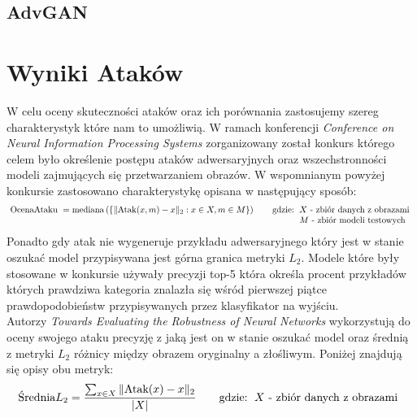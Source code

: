 \documentclass{article}
\begin{document}
\subsection{AdvGAN}

\section{Wyniki Ataków}
    W celu oceny skuteczności ataków oraz ich porównania zastosujemy szereg charakterystyk które nam to umożliwią.
    W ramach konferencji
    \textit{Conference on Neural Information Processing Systems} zorganizowany został konkurs którego celem było
    określenie postępu ataków adwersaryjnych oraz wszechstronności modeli zajmujących się przetwarzaniem obrazów\cite{DBLP:journals/corr/abs-1808-01976}.
    W wspomnianym powyżej konkursie zastosowano charakterystykę opisana w następujący sposób:
    \begin{equation}\label{nips_median}
        \text { OcenaAtaku }=\operatorname{mediana}\left(\left\{\|\text{Atak}{(x, m)}-x\|_2 : x \in X, m \in M\right\}\right)
        \qquad\text{gdzie:}
        \begin{tabular}[t]{ll}
        \(X\) - zbiór danych z obrazami \\
        \(M\) - zbiór modeli testowych\\
        \end{tabular}
    \end{equation}
    Ponadto gdy atak nie wygeneruje przykładu adwersaryjnego który jest w stanie oszukać model przypisywana jest górna granica
    metryki \(L_2\).
    Modele które były stosowane w konkursie używały precyzji top-5 która określa procent przykładów których prawdziwa
    kategoria znalazła się wśród pierwszej piątce prawdopodobieństw przypisywanych przez klasyfikator na wyjściu.\\

    Autorzy \textit{Towards Evaluating the Robustness of Neural Networks}\cite{DBLP:journals/corr/CarliniW16a} wykorzystują do oceny swojego ataku precyzję z jaką jest on w stanie oszukać
    model oraz średnią z metryki \(L_2\) różnicy między obrazem oryginalny a złośliwym. Poniżej znajdują się opisy obu metryk:
    \begin{equation}
        \text{Średnia\(L_2\)}=\frac{\sum_{x \in X}\|\text{Atak}(x)-x\|_2}{|X|}
        \qquad\text{gdzie:}
        \begin{tabular}[t]{ll}
        \(X\) - zbiór danych z obrazami \\
        \end{tabular}
    \end{equation}
\end{document}
